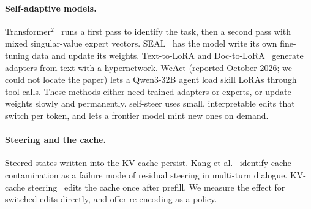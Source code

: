 \paragraph{Self-adaptive models.} Transformer$^2$~\cite{sun2025transformer2} runs a first pass to identify the task, then a second pass with mixed singular-value expert vectors. SEAL~\cite{zweiger2025seal} has the model write its own fine-tuning data and update its weights. Text-to-LoRA and Doc-to-LoRA~\cite{sakana2026doc2lora} generate adapters from text with a hypernetwork. WeAct (reported October 2026; we could not locate the paper) lets a Qwen3-32B agent load skill LoRAs through tool calls. These methods either need trained adapters or experts, or update weights slowly and permanently. self-steer uses small, interpretable edits that switch per token, and lets a frontier model mint new ones on demand.

\paragraph{Steering and the cache.} Steered states written into the KV cache persist. Kang et al.~\cite{kang2026pad} identify cache contamination as a failure mode of residual steering in multi-turn dialogue. KV-cache steering~\cite{belitsky2025kvsteer} edits the cache once after prefill. We measure the effect for switched edits directly, and offer re-encoding as a policy.
